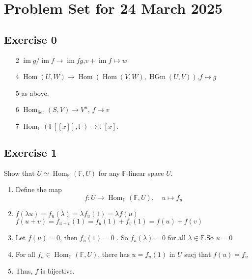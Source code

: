 \documentclass[11pt]{ctexart}
\theoremstyle{definition}
\numberwithin{equation}{section}
\newcommand{\op}[1]{\operatorname{#1}}%
\newcommand{\FF}{\mathbb{F}}%
\theoremstyle{definition}
\theoremstyle{remark}
\begin{document}
\section{Problem Set for 24 March 2025}
\subsection{Exercise 0}
\begin{aaa}
    \begin{enumerate}
        \item [2] $\op{im}g/\op{im}f \to \op{im}fg$,\quad $v+\op{im}f \mapsto w$
        \item [4] $\op{Hom}(U,W)\to \op{Hom}(\op{Hom}(V,W),\op{HGm}(U,V))$,\quad $f \mapsto g$
        \item [5] as above.
        \item [6] $\op{Hom}_{\op{Set}}(S,V) \to V^n$, \quad $f \mapsto v$
        \item [7] $\op{Hom}_{\FF}(\FF[[x]],\FF)\to \FF[x]$.
    \end{enumerate}
\end{aaa}
\subsection{Exercise 1}
Show that $U \simeq \op{Hom}_{\FF}(\FF,U)$ for any $\FF$-linear space $U$.
\begin{aaa}
    \begin{enumerate}
        \item Define the map \[f: U \to \op{Hom}_{\FF}(\FF,U),\quad u \mapsto f_u\]
        \item $f(\lambda u)=f_u(\lambda)=\lambda f_u(1)=\lambda f(u)$\\$f(u+v)=f_{u+v}(1)=f_u(1)+f_v(1)=f(u)+f(v)$
        \item Let $f(u)=0$, then $f_u(1)=0$ . So $f_u(\lambda)=0$ for all $\lambda\in \FF$.So $u=0$
        \item For all $f_u\in \op{Hom}_\FF(\FF,U)$, there has $u=f_u(1)$ in $U$ sucj that $f(u)=f_u$
        \item Thus, $f$ is bijective.
    \end{enumerate}
\end{aaa}
\end{document}
